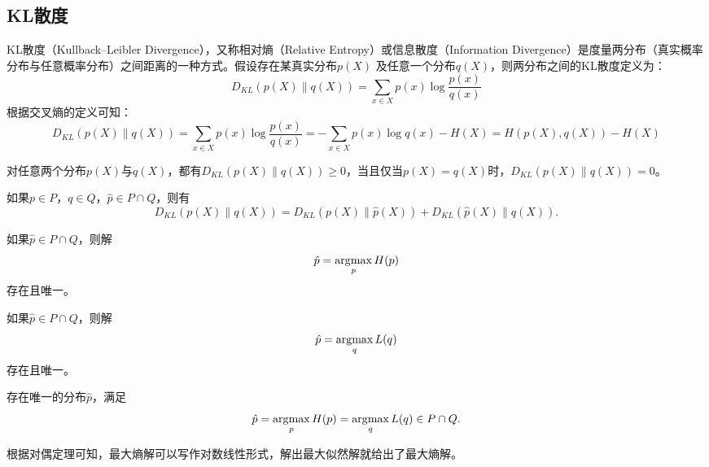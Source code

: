 \subsection{KL散度}
KL散度（Kullback–Leibler Divergence）\cite{kullback1951information,kullback2012information}，又称相对熵（Relative Entropy）或信息散度（Information Divergence）是度量两分布（真实概率分布与任意概率分布）之间距离的一种方式。假设存在某真实分布$p(X)$ 及任意一个分布$q(X)$，则两分布之间的KL散度定义为：
\begin{equation}\label{eq:relativeentropy}
  D_{KL}(p(X)\|q(X)) = \sum_{x\in X}{p(x)\log\frac{p(x)}{q(x)}}
\end{equation}
根据交叉熵的定义可知：
\begin{equation}
    D_{KL}(p(X)\|q(X)) = \sum_{x\in X}{p(x)\log\frac{p(x)}{q(x)}} = -\sum_{x\in X}{p(x)\log q(x)} - H(X) = H(p(X),q(X)) - H(X)
\end{equation}

\begin{lemma}
对任意两个分布$p(X)$与$q(X)$，都有$D_{KL}(p(X)\|q(X))\ge 0$，当且仅当$p(X)=q(X)$时，$D_{KL}(p(X)\|q(X))= 0$。
\end{lemma}
\begin{lemma}[Pythagorean性质]
如果$p\in P$，$q\in Q$，$\hat p\in P\cap Q$，则有
\[
    D_{KL}(p(X)\|q(X))=D_{KL}(p(X)\|\hat p(X)) + D_{KL}(\hat p(X)\|q(X)).
\]
\end{lemma}

\begin{theorem}[最大熵解]
如果$\hat p\in P\cap Q$，则解
\begin{equation}
    \hat p = \operatorname*{\mathrm{\arg\!\max}}\limits_{p} H(p)
\end{equation}
存在且唯一。
\end{theorem}

\begin{theorem}[最大似然解]
如果$\hat p\in P\cap Q$，则解
\begin{equation}
    \hat p = \operatorname*{\mathrm{\arg\!\max}}\limits_{q} L(q)
\end{equation}
存在且唯一。
\end{theorem}

\begin{theorem}[对偶定理]
存在唯一的分布$\hat p$，满足
\begin{equation}
    \hat p = \operatorname*{\mathrm{\arg\!\max}}\limits_{p} H(p) = \operatorname*{\mathrm{\arg\!\max}}\limits_{q} L(q) \in P\cap Q.
\end{equation}
\end{theorem}
根据对偶定理可知，最大熵解可以写作对数线性形式，解出最大似然解就给出了最大熵解。

